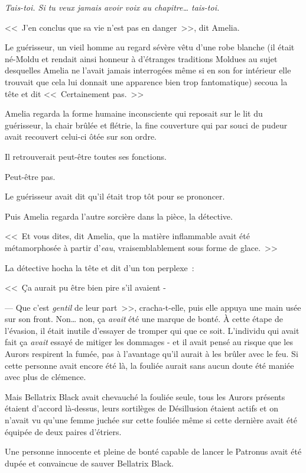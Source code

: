 \emph{Tais-toi. Si tu veux jamais avoir voix au chapitre… tais-toi.}


<<~J'en conclus que sa vie n'est pas en danger~>>, dit Amelia.

Le guérisseur, un vieil homme au regard sévère vêtu d'une robe blanche (il était né-Moldu et rendait ainsi honneur à d'étranges traditions Moldues au sujet desquelles Amelia ne l'avait jamais interrogées même si en son for intérieur elle trouvait que cela lui donnait une apparence bien trop fantomatique) secoua la tête et dit <<~Certainement pas.~>>

Amelia regarda la forme humaine inconsciente qui reposait sur le lit du guérisseur, la chair brûlée et flétrie, la fine couverture qui par souci de pudeur avait recouvert celui-ci ôtée sur son ordre.

Il retrouverait peut-être toutes ses fonctions.

Peut-être pas.

Le guérisseur avait dit qu'il était trop tôt pour se prononcer.

Puis Amelia regarda l'autre sorcière dans la pièce, la détective.

<<~Et vous dites, dit Amelia, que la matière inflammable avait été métamorphosée à partir d'\emph{eau}, vraisemblablement sous forme de glace.~>>

La détective hocha la tête et dit d'un ton perplexe~:

<<~Ça aurait pu être bien pire s'il avaient -

--- Que c'est \emph{gentil} de leur part~>>, cracha-t-elle, puis elle appuya une main usée sur son front. Non… non, ça \emph{avait} été une marque de bonté. À cette étape de l'évasion, il était inutile d'essayer de tromper qui que ce soit. L'individu qui avait fait ça \emph{avait} essayé de mitiger les dommages - et il avait pensé au risque que les Aurors respirent la fumée, pas à l'avantage qu'il aurait à les brûler avec le feu. Si cette personne avait encore été là, la fouliée aurait sans aucun doute été maniée avec plus de clémence.

Mais Bellatrix Black avait chevauché la fouliée seule, tous les Aurors présents étaient d'accord là-dessus, leurs sortilèges de Désillusion étaient actifs et on n'avait vu qu'une femme juchée sur cette fouliée même si cette dernière avait été équipée de deux paires d'étriers.

Une personne innocente et pleine de bonté capable de lancer le Patronus avait été dupée et convaincue de sauver Bellatrix Black.

